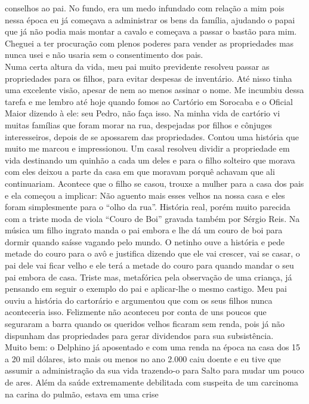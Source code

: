 \documentclass[12pt,brazil,]{book}
\begin{document}
conselhos ao pai. No fundo, era um medo infundado com relação a mim pois
nessa época eu já começava a administrar os bens da família, ajudando o
papai que já não podia mais montar a cavalo e começava a passar o bastão
para mim. Cheguei a ter procuração com plenos poderes para vender as
propriedades mas nunca usei e não usaria sem o consentimento dos pais.\\
Numa certa altura da vida, meu pai muito previdente resolveu passar as
propriedades para os filhos, para evitar despesas de inventário. Até
nisso tinha uma excelente visão, apesar de nem ao menos assinar o nome.
Me incumbiu dessa tarefa e me lembro até hoje quando fomos ao Cartório
em Sorocaba e o Oficial Maior dizendo à ele: seu Pedro, não faça isso.
Na minha vida de cartório vi muitas famílias que foram morar na rua,
despejadas por filhos e cônjuges interesseiros, depois de se apossarem
das propriedades. Contou uma história que muito me marcou e
impressionou. Um casal resolveu dividir a propriedade em vida destinando
um quinhão a cada um deles e para o filho solteiro que morava com eles
deixou a parte da casa em que moravam porquê achavam que ali
continuariam. Acontece que o filho se casou, trouxe a mulher para a casa
dos pais e ela começou a implicar: Não aguento mais esses velhos na
nossa casa e eles foram simplesmente para o ``olho da rua''. História
real, porém muito parecida com a triste moda de viola ``Couro de Boi''
gravada também por Sérgio Reis. Na música um filho ingrato manda o pai
embora e lhe dá um couro de boi para dormir quando saísse vagando pelo
mundo. O netinho ouve a história e pede metade do couro para o avô e
justifica dizendo que ele vai crescer, vai se casar, o pai dele vai
ficar velho e ele terá a metade do couro para quando mandar o seu pai
embora de casa. Triste mas, metafórica pela observação de uma criança,
já pensando em seguir o exemplo do pai e aplicar-lhe o mesmo castigo.
Meu pai ouviu a história do cartorário e argumentou que com os seus
filhos nunca aconteceria isso. Felizmente não aconteceu por conta de uns
poucos que seguraram a barra quando os queridos velhos ficaram sem
renda, pois já não dispunham das propriedades para gerar dividendos para
sua subsistência.\\
Muito bem: o Delphino já aposentado e com uma renda na época na casa dos
15 a 20 mil dólares, isto mais ou menos no ano 2.000 caiu doente e eu
tive que assumir a administração da sua vida trazendo-o para Salto para
mudar um pouco de ares. Além da saúde extremamente debilitada com
suspeita de um carcinoma na carina do pulmão, estava em uma crise
\end{document}
